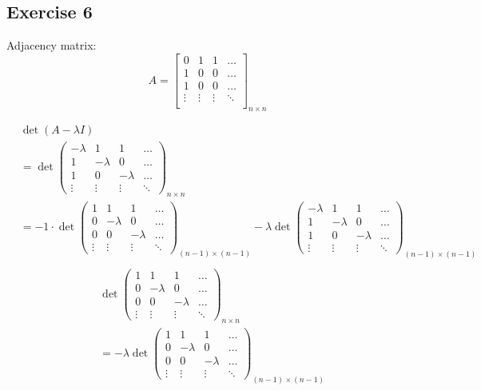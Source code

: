 \documentclass{article}
\begin{document}
\newpage

\subsection*{Exercise 6}

Adjacency matrix:
\[
  A =
  \begin{bmatrix}
    0 & 1 & 1 & \dotso \\
    1 & 0 & 0 & \dotso \\
    1 & 0 & 0 & \dotso \\
    \vdots & \vdots & \vdots & \ddots \\
  \end{bmatrix}_{n \times n}
\]

\begin{align*}
  &\det(A - \lambda I) \\
  &= \det
  \begin{pmatrix}
    -\lambda & 1 & 1 & \dotso \\
    1 & -\lambda & 0 & \dotso \\
    1 & 0 & -\lambda & \dotso \\
    \vdots & \vdots & \vdots & \ddots
  \end{pmatrix}_{n \times n} \\
  &= -1 \cdot \det
  \begin{pmatrix}
    1 & 1 & 1 & \dotso \\
    0 & -\lambda & 0 & \dotso \\
    0 & 0 & -\lambda & \dotso \\
    \vdots & \vdots & \vdots & \ddots
  \end{pmatrix}_{(n - 1) \times (n - 1)}
  - \lambda \det
  \begin{pmatrix}
    -\lambda & 1 & 1 & \dotso \\
    1 & -\lambda & 0 & \dotso \\
    1 & 0 & -\lambda & \dotso \\
    \vdots & \vdots & \vdots & \ddots
  \end{pmatrix}_{(n - 1) \times (n - 1)} \\
\end{align*}
\begin{align*}
  &\det
  \begin{pmatrix}
    1 & 1 & 1 & \dotso \\
    0 & -\lambda & 0 & \dotso \\
    0 & 0 & -\lambda & \dotso \\
    \vdots & \vdots & \vdots & \ddots
  \end{pmatrix}_{n \times n} \\
  &= -\lambda \det
  \begin{pmatrix}
    1 & 1 & 1 & \dotso \\
    0 & -\lambda & 0 & \dotso \\
    0 & 0 & -\lambda & \dotso \\
    \vdots & \vdots & \vdots & \ddots
  \end{pmatrix}_{(n - 1) \times (n - 1)}
\end{align*}
\end{document}
